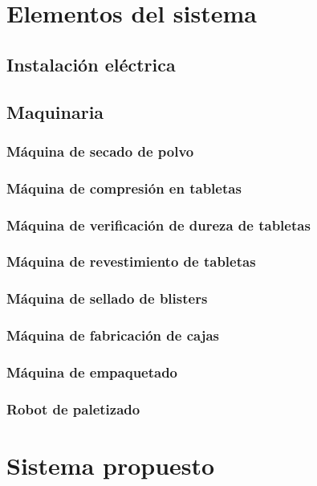 \section{Elementos del sistema}

\subsection{Instalación eléctrica}
\subsection{Maquinaria}
	\subsubsection{Máquina de secado de polvo}
	\subsubsection{Máquina de compresión en tabletas}
	\subsubsection{Máquina de verificación de dureza de tabletas}
	\subsubsection{Máquina de revestimiento de tabletas}
	\subsubsection{Máquina de sellado de blisters }
	\subsubsection{Máquina de fabricación de cajas}	
	\subsubsection{Máquina de empaquetado}
	\subsubsection{Robot de paletizado}
\section{Sistema propuesto}
